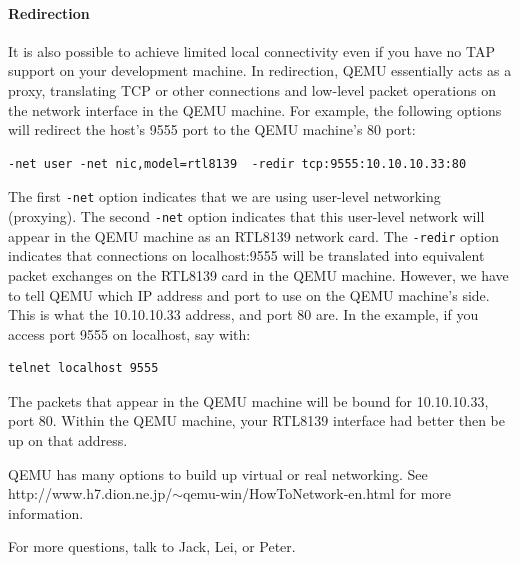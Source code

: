 \documentclass[11pt]{article}
\begin{document}
\paragraph*{Redirection}
It is also possible to achieve limited local connectivity even if you
have no TAP support on your development machine.  In redirection, QEMU
essentially acts as a proxy, translating TCP or other connections and
low-level packet operations on the network interface in the QEMU
machine.  For example, the following options will redirect the host's
9555 port to the QEMU machine's 80 port:
\begin{verbatim}
-net user -net nic,model=rtl8139  -redir tcp:9555:10.10.10.33:80
\end{verbatim}
The first \verb.-net. option indicates that we are using user-level
networking (proxying).  The second \verb.-net. option indicates that
this user-level network will appear in the QEMU machine as an RTL8139
network card.   The \verb.-redir. option indicates that connections on
localhost:9555 will be translated into equivalent packet exchanges on
the RTL8139 card in the QEMU machine.  However, we have to tell QEMU
which IP address and port to use on the QEMU machine's side.  This is
what the 10.10.10.33 address, and port 80 are.  In the example, if you
access port 9555 on localhost, say with:
\begin{verbatim}
telnet localhost 9555
\end{verbatim}
The packets that appear in the QEMU machine will be bound for
10.10.10.33, port 80.  Within the QEMU machine, your RTL8139 interface
had better then be up on that address. 

QEMU has many options to build up virtual or real networking. See
http://www.h7.dion.ne.jp/$\sim$qemu-win/HowToNetwork-en.html for more
information.


For more questions, talk to Jack, Lei,  or Peter.
\end{document}
